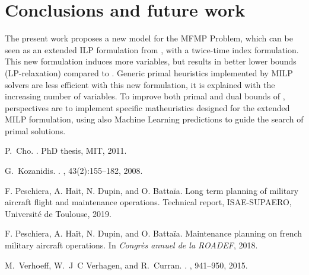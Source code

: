 \documentclass{roadef}
\begin{document}
\section{Conclusions and future work}

    The present work proposes a new model for the MFMP Problem,
    which can be seen as an extended ILP formulation  from \cite{Peschiera2019},  with a     twice-time index formulation.
    This new formulation  induces more variables, but  results in better lower bounds (LP-relaxation) compared to \cite{Peschiera2019}.
   Generic  primal heuristics implemented by MILP solvers  are less efficient with this new formulation, it is explained with the increasing number of variables. To improve both primal and dual bounds of \cite{Peschiera2019}, perspectives are to implement specific matheuristics designed for the extended MILP formulation, using also Machine Learning predictions to guide the search of primal solutions.
    


% 
% 
\small
\begin{thebibliography}{1}

P.~Cho.
.
\newblock PhD thesis, MIT, 2011.

G.~Kozanidis.
.
, 43(2):155--182, 2008.

F. Peschiera, A. Ha{\"i}t, N. Dupin, and O. Batta{\"i}a.
\newblock Long term planning of
military aircraft flight and maintenance operations. 
\newblock Technical report, ISAE-SUPAERO,
Universit\'e de Toulouse, 2019.

F. Peschiera, A. Ha{\"i}t, N. Dupin, and O. Batta{\"i}a.
\newblock Maintenance planning on french military aircraft operations.
\newblock In {\em Congr{\`e}s annuel de la ROADEF}, 2018.

M.~Verhoeff, W.~J~C Verhagen, and R.~Curran.
.
, 941--950, 2015.

\end{thebibliography}
\end{document}
